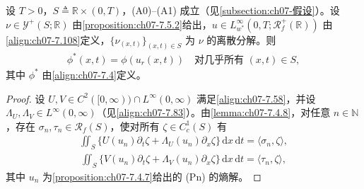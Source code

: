 \documentclass[../../main.tex]{subfiles}%
\begin{document}
\begin{proposition}\label{proposition:ch07-divcurl}\label{proposition:ch07-7.5.6}
设 $T>0$，$S\triangleq\mathbb{R}\times(0,T)$，(A0)--(A1) 成立（见\cref{subsection:ch07-假设}）。设 $\nu\in\mathcal{Y}^+(S;\mathbb{R})$ 由\cref{proposition:ch07-7.5.2}给出，$u\in L^\infty_{w^*}(0,T;\mathscr{R}_f^+(\mathbb{R}))$ 由\eqref{align:ch07-7.108}定义，$\{\nu_{(x,t)}\}_{(x,t)\in S}$ 为 $\nu$ 的离散分解。则
\begin{align}
\phi^*(x,t)=\phi(u_r(x,t))\quad\text{对几乎所有 }(x,t)\in S, \label{align:ch07-7.119}
\end{align}
其中 $\phi^*$ 由\eqref{align:ch07-7.4}定义。
\end{proposition}

\begin{proof}
设 $U,V\in C^2([0,\infty))\cap L^\infty(0,\infty)$ 满足\eqref{align:ch07-7.58}，并设 $\Lambda_U,\Lambda_V\in L^\infty(0,\infty)$（见\eqref{align:ch07-7.83}）。由\cref{lemma:ch07-7.4.8}，对任意 $n\in\mathbb{N}$，存在 $\sigma_n,\tau_n\in\mathscr{R}_f(S)$，使对所有 $\zeta\in C^1_c(S)$ 有
\begin{align}
\iint_S\{U(u_n)\partial_t\zeta+\Lambda_U(u_n)\partial_x\zeta\}\,\mathrm{d}x\,\mathrm{d}t=\langle\sigma_n,\zeta\rangle, \label{align:ch07-7.120a}
\end{align}
\begin{align}
\iint_S\{V(u_n)\partial_t\zeta+\Lambda_V(u_n)\partial_x\zeta\}\,\mathrm{d}x\,\mathrm{d}t=\langle\tau_n,\zeta\rangle, \label{align:ch07-7.120b}
\end{align}
其中 $u_n$ 为\cref{proposition:ch07-7.4.7}给出的 (Pn) 的熵解。


\end{proof}
\end{document}
